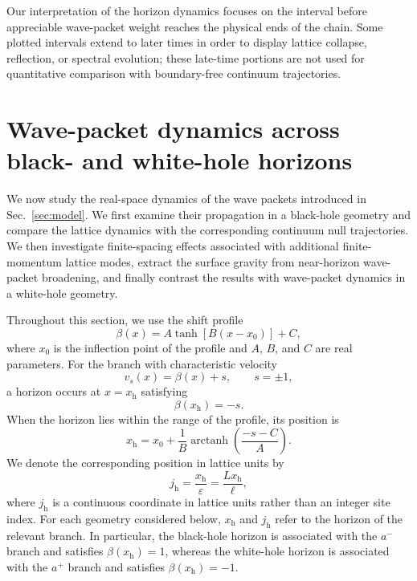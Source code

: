 \documentclass[reprint,amsmath,amssymb,aps,prb,floatfix,showkeys,superscriptaddress]{revtex4-2}
\begin{document}
Our interpretation of the horizon dynamics focuses on the interval
before appreciable wave-packet weight reaches the physical ends of the
chain. Some plotted intervals extend to later times in order to display
lattice collapse, reflection, or spectral evolution; these late-time
portions are not used for quantitative comparison with boundary-free
continuum trajectories.

\section{Wave-packet dynamics across black- and white-hole horizons}
\label{sec:dynamics}

We now study the real-space dynamics of the wave packets introduced
in Sec.~\ref{sec:model}. We first examine their propagation in a
black-hole geometry and compare the lattice dynamics with the
corresponding continuum null trajectories. We then investigate
finite-spacing effects associated with additional finite-momentum
lattice modes, extract the surface gravity from near-horizon
wave-packet broadening, and finally contrast the results with
wave-packet dynamics in a white-hole geometry.

Throughout this section, we use the shift profile
\begin{equation}
  \beta(x)
  =
  A\tanh\left[B(x-x_0)\right]+C,
  \label{eq:beta_profile}
\end{equation}
where $x_0$ is the inflection point of the profile and $A$, $B$,
and $C$ are real parameters. For the branch with characteristic velocity
\begin{equation}
  v_s(x)=\beta(x)+s,
  \qquad
  s=\pm1,
\end{equation}
a horizon occurs at $x=x_{\mathrm h}$ satisfying
\begin{equation}
  \beta(x_{\mathrm h})=-s.
  \label{eq:general_horizon_condition}
\end{equation}
When the horizon lies within the range of the profile, its position
is
\begin{equation}
  x_{\mathrm h}
  =
  x_0
  +
  \frac{1}{B}
  \operatorname{arctanh}
  \left(
    \frac{-s-C}{A}
  \right).
  \label{eq:horizon_position}
\end{equation}
We denote the corresponding position in lattice units by
\begin{equation}
  j_{\mathrm h}
  =
  \frac{x_{\mathrm h}}{\varepsilon}
  =
  \frac{Lx_{\mathrm h}}{\ell},
  \label{eq:lattice_horizon_position}
\end{equation}
where $j_{\mathrm h}$ is a continuous coordinate in lattice units
rather than an integer site index. For each geometry considered
below, $x_{\mathrm h}$ and $j_{\mathrm h}$ refer to the horizon of
the relevant branch. In particular, the black-hole horizon is
associated with the $a^-$ branch and satisfies
$\beta(x_{\mathrm h})=1$, whereas the white-hole horizon is
associated with the $a^+$ branch and satisfies
$\beta(x_{\mathrm h})=-1$.
\end{document}
